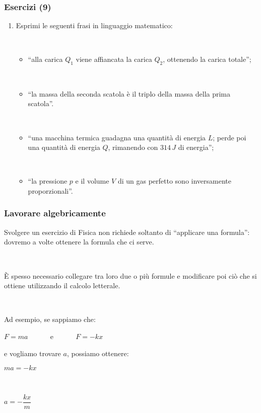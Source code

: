 \documentclass[]{beamer}
\begin{document}
\begin{frame}
\frametitle{Esercizi (9)}
\begin{enumerate}
  \item Esprimi le seguenti frasi in linguaggio matematico:
  
  ~

    \begin{itemize}
        \item ``alla carica $ Q_1 $ viene affiancata la carica $ Q_2 $, ottenendo la carica totale'';
        
        ~

        \item ``la massa della seconda scatola è il triplo della massa della prima scatola''.
        
        ~
        
        \item ``una macchina termica guadagna una quantità di energia $ L $; perde poi una quantità di energia $ Q $, rimanendo con $ 314 \, J $ di energia'';
        
        ~
        
        \item ``la pressione $ p $ e il volume $ V $ di un gas perfetto sono inversamente proporzionali''.
    \end{itemize}
\end{enumerate}
\end{frame}



\begin{frame}
\frametitle{Lavorare algebricamente}
Svolgere un esercizio di Fisica non richiede soltanto di ``applicare una formula'': dovremo a volte \alert<1>{ottenere la formula} che ci serve.\pause

~

È spesso necessario \alert<2>{collegare tra loro due o più formule} e modificare poi ciò che si ottiene utilizzando il \alert<2>{calcolo letterale}.\pause

~

Ad esempio, se sappiamo che:
\begin{center}
  $ F = ma $ ~~~~~ e ~~~~~ $ F = -kx $
\end{center}
e vogliamo trovare $a$,{\pause} possiamo ottenere:
\begin{center}
  $ ma = -kx $\pause

  ~

  $ a = -\dfrac{kx}{m} $
\end{center}
\end{frame}
\end{document}
